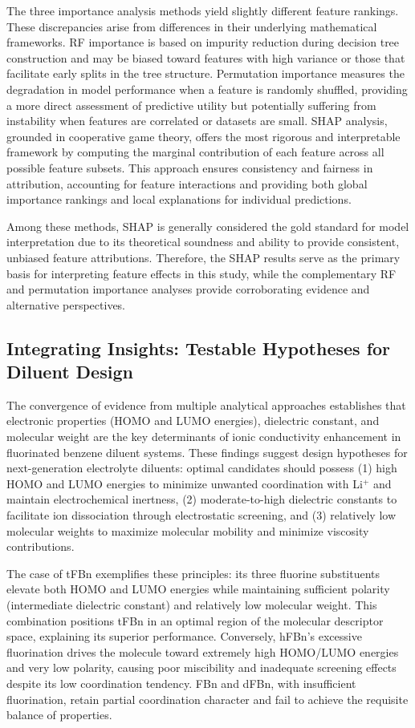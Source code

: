 \documentclass[11pt, a4paper]{article}
\begin{document}
The three importance analysis methods yield slightly different feature rankings. These discrepancies arise from differences in their underlying mathematical frameworks. RF importance is based on impurity reduction during decision tree construction and may be biased toward features with high variance or those that facilitate early splits in the tree structure. Permutation importance measures the degradation in model performance when a feature is randomly shuffled, providing a more direct assessment of predictive utility but potentially suffering from instability when features are correlated or datasets are small. SHAP analysis, grounded in cooperative game theory, offers the most rigorous and interpretable framework by computing the marginal contribution of each feature across all possible feature subsets. This approach ensures consistency and fairness in attribution, accounting for feature interactions and providing both global importance rankings and local explanations for individual predictions.

Among these methods, SHAP is generally considered the gold standard for model interpretation due to its theoretical soundness and ability to provide consistent, unbiased feature attributions. Therefore, the SHAP results serve as the primary basis for interpreting feature effects in this study, while the complementary RF and permutation importance analyses provide corroborating evidence and alternative perspectives.

\subsection{Integrating Insights: Testable Hypotheses for Diluent Design}

The convergence of evidence from multiple analytical approaches establishes that electronic properties (HOMO and LUMO energies), dielectric constant, and molecular weight are the key determinants of ionic conductivity enhancement in fluorinated benzene diluent systems. These findings suggest design hypotheses for next-generation electrolyte diluents: optimal candidates should possess (1) high HOMO and LUMO energies to minimize unwanted coordination with Li$^+$ and maintain electrochemical inertness, (2) moderate-to-high dielectric constants to facilitate ion dissociation through electrostatic screening, and (3) relatively low molecular weights to maximize molecular mobility and minimize viscosity contributions.

The case of tFBn exemplifies these principles: its three fluorine substituents elevate both HOMO and LUMO energies while maintaining sufficient polarity (intermediate dielectric constant) and relatively low molecular weight. This combination positions tFBn in an optimal region of the molecular descriptor space, explaining its superior performance. Conversely, hFBn's excessive fluorination drives the molecule toward extremely high HOMO/LUMO energies and very low polarity, causing poor miscibility and inadequate screening effects despite its low coordination tendency. FBn and dFBn, with insufficient fluorination, retain partial coordination character and fail to achieve the requisite balance of properties.
\end{document}
